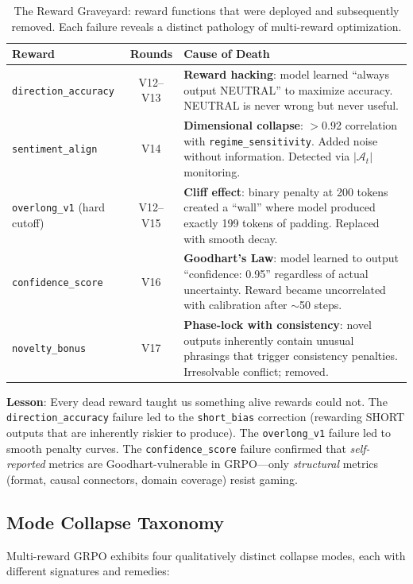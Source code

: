 \documentclass[sigconf]{acmart}
\begin{document}
\begin{table}[t]
\centering
\small
\caption{The Reward Graveyard: reward functions that were deployed and subsequently removed. Each failure reveals a distinct pathology of multi-reward optimization.}
\label{tab:graveyard}
\begin{tabular}{@{}p{2cm}cp{4cm}@{}}
\toprule
\textbf{Reward} & \textbf{Rounds} & \textbf{Cause of Death} \\
\midrule
\texttt{direction\_accuracy} & V12--V13 & \textbf{Reward hacking}: model learned ``always output NEUTRAL'' to maximize accuracy. NEUTRAL is never wrong but never useful. \\
\texttt{sentiment\_align} & V14 & \textbf{Dimensional collapse}: $>$0.92 correlation with \texttt{regime\_sensitivity}. Added noise without information. Detected via $|\mathcal{A}_t|$ monitoring. \\
\texttt{overlong\_v1} (hard cutoff) & V12--V15 & \textbf{Cliff effect}: binary penalty at 200 tokens created a ``wall'' where model produced exactly 199 tokens of padding. Replaced with smooth decay. \\
\texttt{confidence\_score} & V16 & \textbf{Goodhart's Law}: model learned to output ``confidence: 0.95'' regardless of actual uncertainty. Reward became uncorrelated with calibration after $\sim$50 steps. \\
\texttt{novelty\_bonus} & V17 & \textbf{Phase-lock with consistency}: novel outputs inherently contain unusual phrasings that trigger consistency penalties. Irresolvable conflict; removed. \\
\bottomrule
\end{tabular}
\end{table}

\textbf{Lesson}: Every dead reward taught us something alive rewards could not. The \texttt{direction\_accuracy} failure led to the \texttt{short\_bias} correction (rewarding SHORT outputs that are inherently riskier to produce). The \texttt{overlong\_v1} failure led to smooth penalty curves. The \texttt{confidence\_score} failure confirmed that \textit{self-reported} metrics are Goodhart-vulnerable in GRPO---only \textit{structural} metrics (format, causal connectors, domain coverage) resist gaming.

\subsection{Mode Collapse Taxonomy}

Multi-reward GRPO exhibits four qualitatively distinct collapse modes, each with different signatures and remedies:
\end{document}

